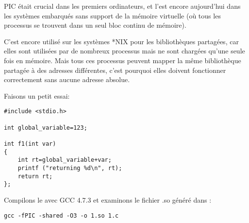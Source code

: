 \ac{PIC} était crucial dans les premiers ordinateurs, et l'est encore aujourd'hui dans les systèmes embarqués
sans support de la mémoire virtuelle (où tous les processus se trouvent dans un seul bloc continu de mémoire).

C'est encore utilisé sur les systèmes *NIX pour les bibliothèques partagées, car elles
sont utilisées par de nombreux processus mais ne sont chargées qu'une seule fois en mémoire.
Mais tous ces processus peuvent mapper la même bibliothèque partagée à des adresses différentes,
c'est pourquoi elles doivent fonctionner correctement sans aucune adresse absolue.


Faisons un petit essai:

\begin{lstlisting}[style=customc]
#include <stdio.h>

int global_variable=123;

int f1(int var)
{
    int rt=global_variable+var;
    printf ("returning %d\n", rt);
    return rt;
};
\end{lstlisting}

Compilons le avec GCC 4.7.3 et examinons le fichier .so généré dans \IDA:

\begin{lstlisting}
gcc -fPIC -shared -O3 -o 1.so 1.c
\end{lstlisting}

